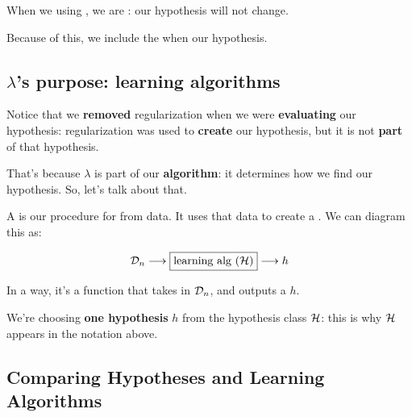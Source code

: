         \begin{clarification}
            When we  using , we are : our hypothesis will not change.
            
            Because of this, we  include the  when  our hypothesis.
        \end{clarification}
        
    \subsection{$\lambda$'s purpose: learning algorithms}
    
        Notice that we \textbf{removed} regularization when we were \textbf{evaluating} our hypothesis: regularization was used to \textbf{create} our hypothesis, but it is not \textbf{part} of that hypothesis.
        
        That's because $\lambda$ is part of our \textbf{algorithm}: it determines how we find our hypothesis. So, let's talk about that.\\
        
        \begin{definition}
            A  is our procedure for  from data. It uses that data to create a . We can diagram this as:
            
            \begin{equation*}
                {\cal D}_n \longrightarrow 
                \boxed{\text{learning alg (${\cal H}$)}} 
                \longrightarrow h
            \end{equation*}
            
            In a way, it's a function that takes in  ${\cal D}_n$, and outputs a  $h$.
        \end{definition}
        
        We're choosing \textbf{one hypothesis} $h$ from the hypothesis class ${\cal H}$: this is why ${\cal H}$ appears in the notation above.
        
    \subsection{Comparing Hypotheses and Learning Algorithms}
        
